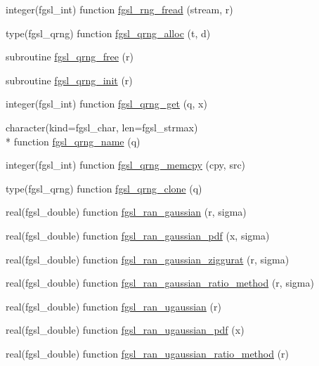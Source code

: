 \begin{DoxyCompactItemize}
\item 
integer(fgsl\-\_\-int) function \hyperlink{rng_8finc_a1e80994301a7b45f4203ce55d90a86fe}{fgsl\-\_\-rng\-\_\-fread} (stream, r)
\item 
type(fgsl\-\_\-qrng) function \hyperlink{rng_8finc_a5dd0e79d47ed21591ed2906315a5ed4b}{fgsl\-\_\-qrng\-\_\-alloc} (t, d)
\item 
subroutine \hyperlink{rng_8finc_ac61e779e7158279aa883358098f67a5a}{fgsl\-\_\-qrng\-\_\-free} (r)
\item 
subroutine \hyperlink{rng_8finc_adbebd9f4a0213e6eb61756e412046d67}{fgsl\-\_\-qrng\-\_\-init} (r)
\item 
integer(fgsl\-\_\-int) function \hyperlink{rng_8finc_a4c172d25dab4c49dba69428b61bc4adf}{fgsl\-\_\-qrng\-\_\-get} (q, x)
\item 
character(kind=fgsl\-\_\-char, len=fgsl\-\_\-strmax) \\*
function \hyperlink{rng_8finc_af55d78c79c3e7d3a3d8666fc7dfc6ddd}{fgsl\-\_\-qrng\-\_\-name} (q)
\item 
integer(fgsl\-\_\-int) function \hyperlink{rng_8finc_a7ce0da63d2654bb003f84a999bb7b6ce}{fgsl\-\_\-qrng\-\_\-memcpy} (cpy, src)
\item 
type(fgsl\-\_\-qrng) function \hyperlink{rng_8finc_af9487d956c6b72f72ccb50a5ed28e92d}{fgsl\-\_\-qrng\-\_\-clone} (q)
\item 
real(fgsl\-\_\-double) function \hyperlink{rng_8finc_a04f4cd4894dc3510006365f5211b8dda}{fgsl\-\_\-ran\-\_\-gaussian} (r, sigma)
\item 
real(fgsl\-\_\-double) function \hyperlink{rng_8finc_aefb1b7aca8d4240cdf6ad29706f53ba6}{fgsl\-\_\-ran\-\_\-gaussian\-\_\-pdf} (x, sigma)
\item 
real(fgsl\-\_\-double) function \hyperlink{rng_8finc_ab23c2a1b1d2f0b21697675ac00fca191}{fgsl\-\_\-ran\-\_\-gaussian\-\_\-ziggurat} (r, sigma)
\item 
real(fgsl\-\_\-double) function \hyperlink{rng_8finc_a3a942206e136585fd8ffb9761bbad505}{fgsl\-\_\-ran\-\_\-gaussian\-\_\-ratio\-\_\-method} (r, sigma)
\item 
real(fgsl\-\_\-double) function \hyperlink{rng_8finc_a679c4c83b2e8f8cedc96f5eca1b7929a}{fgsl\-\_\-ran\-\_\-ugaussian} (r)
\item 
real(fgsl\-\_\-double) function \hyperlink{rng_8finc_ab45ce99f5d0cc4b3b7981cb89584c0ca}{fgsl\-\_\-ran\-\_\-ugaussian\-\_\-pdf} (x)
\item 
real(fgsl\-\_\-double) function \hyperlink{rng_8finc_a720e375637bfce16e56c42f2e11b5802}{fgsl\-\_\-ran\-\_\-ugaussian\-\_\-ratio\-\_\-method} (r)

\end{DoxyCompactItemize}
